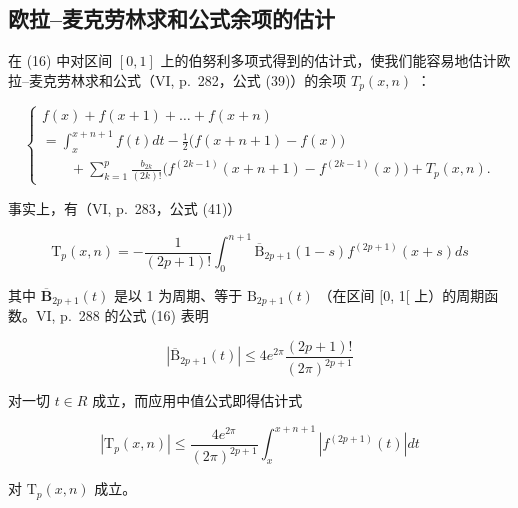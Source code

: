 \subsection{欧拉–麦克劳林求和公式余项的估计}

在 (16) 中对区间 \([0, 1]\) 上的伯努利多项式得到的估计式，使我们能容易地估计欧拉–麦克劳林求和公式（VI, p.~282，公式 (39)）的余项 \(T_{p}(x, n)\) ：

\[
\left\{ \begin{array}{l} f (x) + f (x + 1) + \dots + f (x + n) \\ = \int_ {x} ^ {x + n + 1} f (t) d t - \frac {1}{2} \bigl (f (x + n + 1) - f (x) \bigr) \\ \qquad + \sum_ {k = 1} ^ {p} \frac {b _ {2 k}}{(2 k) !} \bigl (f ^ {(2 k - 1)} (x + n + 1) - f ^ {(2 k - 1)} (x) \bigr) + T _ {p} (x, n). \end{array} \right.\tag{1}
\]

事实上，有（VI, p.~283，公式 (41)）

\[
\mathrm{T} _ {p} (x, n) = - \frac {1}{(2 p + 1) !} \int_ {0} ^ {n + 1} \overline {{\mathrm{B}}} _ {2 p + 1} (1 - s) f ^ {(2 p + 1)} (x + s) d s\tag{2}
\]

其中 \(\overline{\mathbf{B}}_{2p + 1}(t)\) 是以 1 为周期、等于 \(\mathrm{B}_{2p + 1}(t)\) （在区间 {[}0, 1{[} 上）的周期函数。VI, p.~288 的公式 (16) 表明

\[
\left| \overline {{{{\mathrm{B}}}}} _ {2 p + 1} (t) \right| \leqslant 4 e ^ {2 \pi} \frac {(2 p + 1) !}{(2 \pi) ^ {2 p + 1}}\tag{3}
\]

对一切 \(t \in R\) 成立，而应用中值公式即得估计式

\[
\left| \mathrm{T} _ {p} (x, n) \right| \leqslant \frac {4 e ^ {2 \pi}}{(2 \pi) ^ {2 p + 1}} \int_ {x} ^ {x + n + 1} \left| f ^ {(2 p + 1)} (t) \right| d t\tag{4}
\]

对 \(\mathrm{T}_p(x,n)\) 成立。

